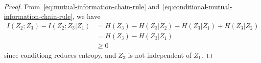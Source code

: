 \documentclass[
  coursecode={MTHE 474},
  assignmentname={Homework \homeworknumber},
  studentnumber=20053722,
  name={Bryan Hoang},
  draft,
]{
  ltxanswer%
}
\begin{document}
\begin{questions}
\begin{parts}
      \part{}
      \begin{solution}
        \begin{proof}
          From~\eqref{eq:mutual-information-chain-rule} and~\eqref{eq:conditional-mutual-information-chain-rule}, we have
          \begin{align*}
            I(Z_{2};Z_{3}) - I(Z_{2};Z_{3}|Z_{1}) &= H(Z_{3}) - H(Z_{3}|Z_{2}) - H(Z_{3}|Z_{1}) + H(Z_{3}|Z_{2}) \\
                                                  &= H(Z_{3}) - H(Z_{3}|Z_{1})                                   \\
                                                  &\ge 0
          \end{align*}
          since conditiong reduces entropy, and \(Z_{3}\) is not independent of \(Z_{1}\).
        \end{proof}
      \end{solution}
    \end{parts}
  \end{questions}
\end{document}
